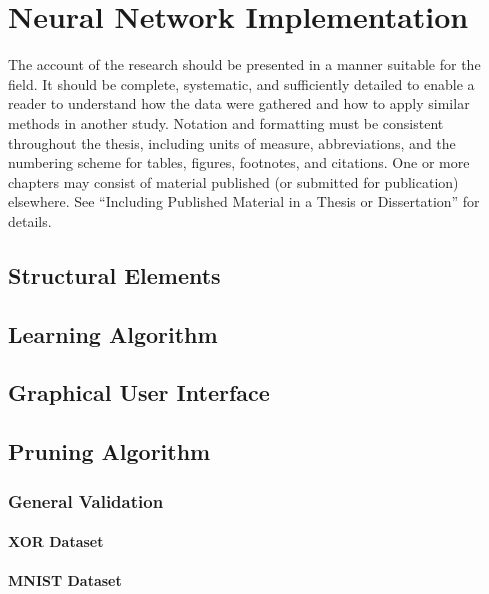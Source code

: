 \chapter{Neural Network Implementation}
\label{chapter:04:neural_net_implementation}

The account of the research should be presented in a manner suitable for the field. It should be complete, systematic, and sufficiently detailed to enable a reader to understand how the data were gathered and how to apply similar methods in another study. Notation and formatting must be consistent throughout the thesis, including units of measure, abbreviations, and the numbering scheme for tables, figures, footnotes, and citations. One or more chapters may consist of material published (or submitted for publication) elsewhere. See “Including Published Material in a Thesis or Dissertation” for details.
\section{Structural Elements}

\section{Learning Algorithm}

\section{Graphical User Interface}

\section{Pruning Algorithm}
\subsection{General Validation}

\subsubsection*{XOR Dataset}
\subsubsection*{MNIST Dataset}